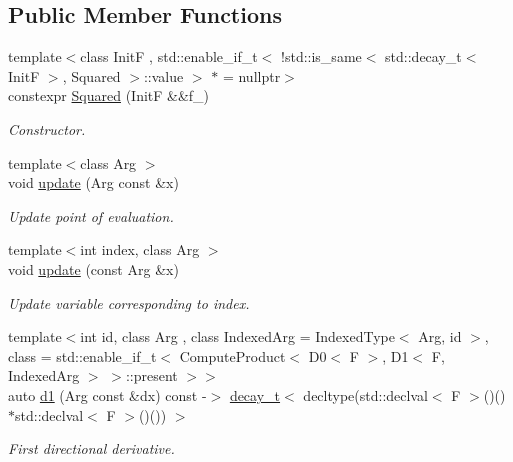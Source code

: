 \subsection*{Public Member Functions}
\begin{DoxyCompactItemize}
\item 
{\footnotesize template$<$class Init\-F , std\-::enable\-\_\-if\-\_\-t$<$ !std\-::is\-\_\-same$<$ std\-::decay\-\_\-t$<$ Init\-F $>$, Squared $>$\-::value $>$ $\ast$  = nullptr$>$ }\\constexpr \hyperlink{structFunG_1_1MathematicalOperations_1_1Squared_a025b768a43feca27fa1c2d23cba4281e}{Squared} (Init\-F \&\&f\-\_\-)
\begin{DoxyCompactList}\small\item\em Constructor. \end{DoxyCompactList}\item 
{\footnotesize template$<$class Arg $>$ }\\void \hyperlink{structFunG_1_1MathematicalOperations_1_1Squared_abea95d90dc29ac105c43f4eadde84cab}{update} (Arg const \&x)
\begin{DoxyCompactList}\small\item\em Update point of evaluation. \end{DoxyCompactList}\item 
{\footnotesize template$<$int index, class Arg $>$ }\\void \hyperlink{structFunG_1_1MathematicalOperations_1_1Squared_a1d890825175df9b79fd73bf8248496ad}{update} (const Arg \&x)
\begin{DoxyCompactList}\small\item\em Update variable corresponding to index. \end{DoxyCompactList}\item 
{\footnotesize template$<$int id, class Arg , class Indexed\-Arg  = Indexed\-Type$<$ Arg, id $>$, class  = std\-::enable\-\_\-if\-\_\-t$<$                           Compute\-Product$<$ D0$<$ F $>$, D1$<$ F, Indexed\-Arg $>$ $>$\-::present $>$$>$ }\\auto \hyperlink{structFunG_1_1MathematicalOperations_1_1Squared_a7b8b5c574a5a5fdc4ca8dfbbfc3b6413}{d1} (Arg const \&dx) const -\/$>$ \hyperlink{namespaceFunG_a7ff91644f18a190ac3d4fc9e970ebe2e}{decay\-\_\-t}$<$ decltype(std\-::declval$<$ F $>$()()$\ast$std\-::declval$<$ F $>$()()) $>$
\begin{DoxyCompactList}\small\item\em First directional derivative. \end{DoxyCompactList}\item 

\end{DoxyCompactItemize}
